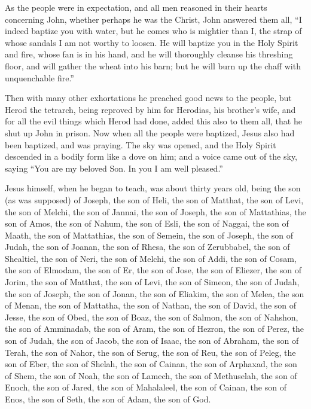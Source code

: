 {\par }{\PP {}As the people were in expectation, and all men reasoned in their hearts concerning John, whether perhaps he was the Christ,
John answered them all, “I indeed baptize you with water, but he comes who is mightier than I, the strap of whose sandals I am not worthy to loosen. He will baptize you in the Holy Spirit and fire,
whose fan is in his hand, and he will thoroughly cleanse his threshing floor, and will gather the wheat into his barn; but he will burn up the chaff with unquenchable fire.”
\par }{\PP {}Then with many other exhortations he preached good news to the people,
but Herod the tetrarch, being reproved by him for Herodias, his brother’s
 wife, and for all the evil things which Herod had done,
added this also to them all, that he shut up John in prison.
Now when all the people were baptized, Jesus also had been baptized, and was praying. The sky was opened,
and the Holy Spirit descended in a bodily form like a dove on him; and a voice came out of the sky, saying “You are my beloved Son. In you I am well pleased.”
\par }{\PP {}Jesus himself, when he began to teach, was about thirty years old, being the son (as was supposed) of Joseph, the son of Heli,
the son of Matthat, the son of Levi, the son of Melchi, the son of Jannai, the son of Joseph,
the son of Mattathias, the son of Amos, the son of Nahum, the son of Esli, the son of Naggai,
the son of Maath, the son of Mattathias, the son of Semein, the son of Joseph, the son of Judah,
the son of Joanan, the son of Rhesa, the son of Zerubbabel, the son of Shealtiel, the son of Neri,
the son of Melchi, the son of Addi, the son of Cosam, the son of Elmodam, the son of Er,
the son of Jose, the son of Eliezer, the son of Jorim, the son of Matthat, the son of Levi,
the son of Simeon, the son of Judah, the son of Joseph, the son of Jonan, the son of Eliakim,
the son of Melea, the son of Menan, the son of Mattatha, the son of Nathan, the son of David,
the son of Jesse, the son of Obed, the son of Boaz, the son of Salmon, the son of Nahshon,
the son of Amminadab, the son of Aram, the son of Hezron, the son of Perez, the son of Judah,
the son of Jacob, the son of Isaac, the son of Abraham, the son of Terah, the son of Nahor,
the son of Serug, the son of Reu, the son of Peleg, the son of Eber, the son of Shelah,
the son of Cainan, the son of Arphaxad, the son of Shem, the son of Noah, the son of Lamech,
the son of Methuselah, the son of Enoch, the son of Jared, the son of Mahalaleel, the son of Cainan,
the son of Enos, the son of Seth, the son of Adam, the son of God.

}
